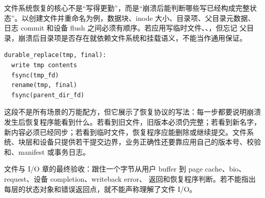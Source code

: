 文件系统恢复的核心不是“写得更勤”，而是“崩溃后能判断哪些写已经构成完整状态”。以创建文件并重命名为例，数据块、inode 大小、目录项、父目录元数据、日志 commit 和设备 flush 之间必须有顺序。若应用写临时文件、、，但忘记  父目录，崩溃后目录项是否存在就依赖文件系统和挂载语义，不能当作通用保证。

\begin{lstlisting}
durable_replace(tmp, final):
  write tmp contents
  fsync(tmp_fd)
  rename(tmp, final)
  fsync(parent_dir_fd)
\end{lstlisting}

这段不是所有场景的万能配方，但它展示了恢复协议的写法：每一步都要说明崩溃发生后恢复程序能看到什么。若看到旧文件，旧版本必须仍完整；若看到新名字，新内容必须已经同步；若看到临时文件，恢复程序应能删除或继续提交。文件系统、块层和设备只提供若干提交边界，业务正确性还要靠应用自己的版本号、校验和、manifest 或事务日志。

\begin{rubricbox}
文件与 I/O 章的最终验收：跟住一个字节从用户 buffer 到 page cache、bio、request、设备 completion、writeback error、 返回和恢复程序判断。若不能指出每层的状态对象和错误返回点，就不能声称理解了文件 I/O。
\end{rubricbox}
